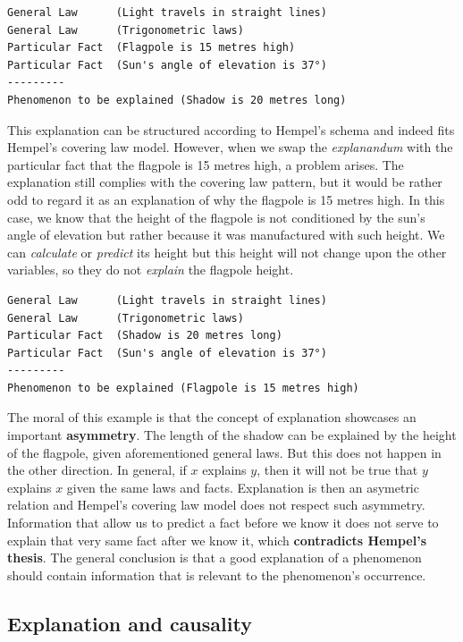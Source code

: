 \documentclass[
]{book}
\begin{document}
\begin{verbatim}
General Law      (Light travels in straight lines)
General Law      (Trigonometric laws)
Particular Fact  (Flagpole is 15 metres high)
Particular Fact  (Sun's angle of elevation is 37°)
---------
Phenomenon to be explained (Shadow is 20 metres long)
\end{verbatim}

This explanation can be structured according to Hempel's schema and indeed fits Hempel's covering law model. However, when we swap the \emph{explanandum} with the particular fact that the flagpole is 15 metres high, a problem arises. The explanation still complies with the covering law pattern, but it would be rather odd to regard it as an explanation of why the flagpole is 15 metres high. In this case, we know that the height of the flagpole is not conditioned by the sun's angle of elevation but rather because it was manufactured with such height. We can \emph{calculate} or \emph{predict} its height but this height will not change upon the other variables, so they do not \emph{explain} the flagpole height.

\begin{verbatim}
General Law      (Light travels in straight lines)
General Law      (Trigonometric laws)
Particular Fact  (Shadow is 20 metres long)
Particular Fact  (Sun's angle of elevation is 37°)
---------
Phenomenon to be explained (Flagpole is 15 metres high)
\end{verbatim}

The moral of this example is that the concept of explanation showcases an important \textbf{asymmetry}. The length of the shadow can be explained by the height of the flagpole, given aforementioned general laws. But this does not happen in the other direction. In general, if \(x\) explains \(y\), then it will not be true that \(y\) explains \(x\) given the same laws and facts. Explanation is then an asymetric relation and Hempel's covering law model does not respect such asymmetry. Information that allow us to predict a fact before we know it does not serve to explain that very same fact after we know it, which \textbf{contradicts Hempel's thesis}.
The general conclusion is that a good explanation of a phenomenon should contain information that is relevant to the phenomenon's occurrence.

\hypertarget{explanation-and-causality}{%
\subsection{Explanation and causality}\label{explanation-and-causality}}
\end{document}

